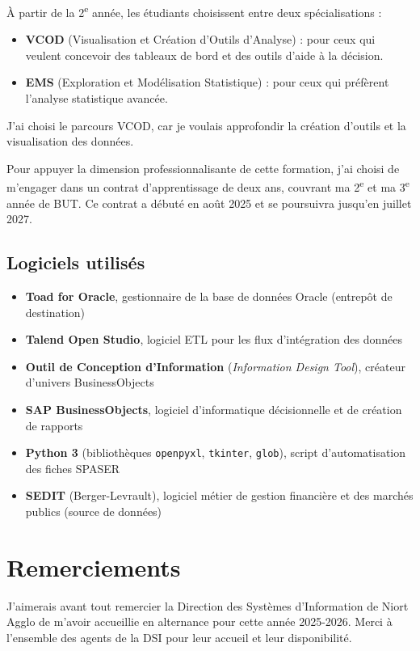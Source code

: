 \documentclass[11pt,a4paper]{article}
\begin{document}
À partir de la 2\textsuperscript{e} année, les étudiants choisissent entre deux spécialisations :
\begin{itemize}
\item \textbf{VCOD} (Visualisation et Création d'Outils d'Analyse) : pour ceux qui veulent concevoir des tableaux de bord et des outils d'aide à la décision.
\item \textbf{EMS} (Exploration et Modélisation Statistique) : pour ceux qui préfèrent l'analyse statistique avancée.
\end{itemize}
J'ai choisi le parcours VCOD, car je voulais approfondir la création d'outils et la visualisation des données.

Pour appuyer la dimension professionnalisante de cette formation, j'ai choisi de m'engager dans un contrat d'apprentissage de deux ans, couvrant ma 2\textsuperscript{e} et ma 3\textsuperscript{e} année de BUT. Ce contrat a débuté en août 2025 et se poursuivra jusqu'en juillet 2027.

\subsection*{Logiciels utilisés}
\begin{itemize}
\item \textbf{Toad for Oracle}, gestionnaire de la base de données Oracle (entrepôt de destination)
\item \textbf{Talend Open Studio}, logiciel ETL pour les flux d'intégration des données
\item \textbf{Outil de Conception d'Information} (\textit{Information Design Tool}), créateur d'univers BusinessObjects
\item \textbf{SAP BusinessObjects}, logiciel d'informatique décisionnelle et de création de rapports
\item \textbf{Python 3} (bibliothèques \texttt{openpyxl}, \texttt{tkinter}, \texttt{glob}), script d'automatisation des fiches SPASER
\item \textbf{SEDIT} (Berger-Levrault), logiciel métier de gestion financière et des marchés publics (source de données)
\end{itemize}

\newpage
\section*{Remerciements}
J'aimerais avant tout remercier la Direction des Systèmes d'Information de Niort Agglo de m'avoir accueillie en alternance pour cette année 2025-2026. Merci à l'ensemble des agents de la DSI pour leur accueil et leur disponibilité.
\end{document}
